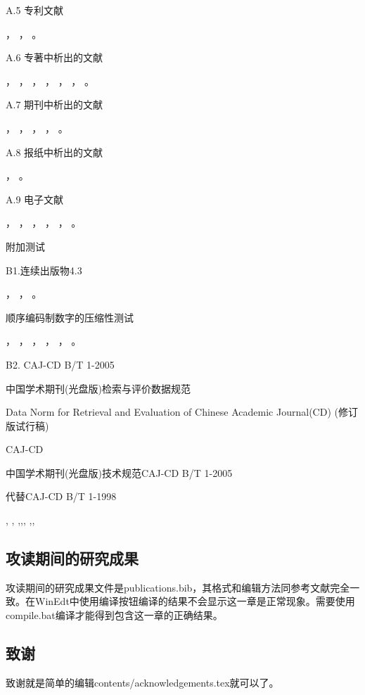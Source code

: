 A.5 专利文献

\cite{LIUJIALIN1993}，
\cite{hblz2001}，
\cite{KOSEKI2002}。

A.6 专著中析出的文献

\cite{baishunong1998}，
\cite{gjbzjxxflbmyjs1988}，
\cite{hanjiren1985}，
\cite{BUSECK1980}，
\cite{FOURNEY1971}，
\cite{feilisheng1981}，
\cite{MARTIN1996}。

A.7 期刊中析出的文献

\cite{libingmu2000}，
\cite{taorengji1984}，
\cite{yzdztbmz1978}，
\cite{MARAIS1992}，
\cite{HEWITT1984}。

A.8 报纸中析出的文献

\cite{Dingwenxiang2000}，
\cite{Zhangtianqing2000}。

A.9 电子文献

\cite{jiangxiangdong1999}，
\cite{xiaoniu2001}，
\cite{CHRISTINE1998}，
\cite{METCALF1995}，
\cite{TURCOTTE1992}，
\cite{Scitor1983}。

附加测试

B1.连续出版物4.3

\cite{zgdzxh1936}，
\cite{zgtsgxh1957}，
\cite{AAAS1883}。

顺序编码制数字的压缩性测试

\cite{angwen1988,baishunong1998,Dingwenxiang2000,gxzzzzqlyt1993,
jiangyouxu1998,tangxujun1999,zhaokaihua1995,wangang1912,zhaoyaodong1998}，
\cite{crawfprd1995}，
\cite{iflai1977}，
\cite{obrien1994}，
\cite{rood2001}，
\cite{angwen1988}。

B2. CAJ-CD B/T 1-2005

中国学术期刊(光盘版)检索与评价数据规范

Data Norm for Retrieval and Evaluation of Chinese Academic Journal(CD) (修订版试行稿)

CAJ-CD

中国学术期刊(光盘版)技术规范CAJ-CD B/T 1-2005

代替CAJ-CD B/T 1-1998

\cite[12]{zhuyixuan1985},
\cite{yejianying1946},
\cite{gwywgzjj1958},\cite{shenkuogwywgzjj1070},\cite{jiyun1800},
\cite{liujiang2004},\cite{wanjingkun1996},\cite{dai1983}
\subsection{攻读期间的研究成果}
攻读期间的研究成果文件是publications.bib，其格式和编辑方法同参考文献完全一致。在WinEdt中使用编译按钮编译的结果不会显示这一章是正常现象。需要使用compile.bat编译才能得到包含这一章的正确结果。
\subsection{致谢}
致谢就是简单的编辑contents/acknowledgements.tex就可以了。
